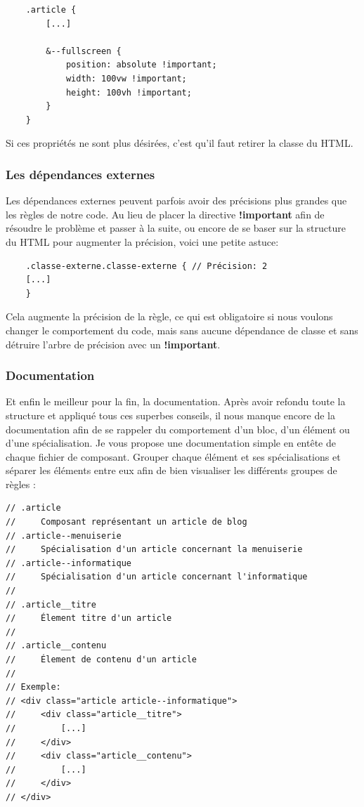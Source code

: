 \documentclass[12pt, a4paper]{report}
\begin{document}
\begin{appendix}
\begin{lstlisting}
    .article {
        [...]

        &--fullscreen {
            position: absolute !important;
            width: 100vw !important;
            height: 100vh !important;
        }
    }
\end{lstlisting}

Si ces propriétés ne sont plus désirées, c'est qu'il faut retirer la classe du HTML.

\subsubsection{Les dépendances externes}

Les dépendances externes peuvent parfois avoir des précisions plus grandes que les règles de notre code.
Au lieu de placer la directive \textbf{!important} afin de résoudre le problème et passer à la suite, ou encore de se baser sur la structure du HTML pour augmenter la précision, voici une petite astuce:

\begin{lstlisting}
    .classe-externe.classe-externe { // Précision: 2
    [...]
    }
\end{lstlisting}

Cela augmente la précision de la règle, ce qui est obligatoire si nous voulons changer le comportement du code, mais sans aucune dépendance de classe et sans détruire l'arbre de précision avec un \textbf{!important}.

\subsubsection{Documentation}

Et enfin le meilleur pour la fin, la documentation.
Après avoir refondu toute la structure et appliqué tous ces superbes conseils, il nous manque encore de la documentation afin de se rappeler du comportement d'un bloc, d'un élément ou d'une spécialisation.
Je vous propose une documentation simple en entête de chaque fichier de composant.
Grouper chaque élément et ses spécialisations et séparer les éléments entre eux afin de bien visualiser les différents groupes de règles :

\begin{lstlisting}
// .article
//     Composant représentant un article de blog
// .article--menuiserie
//     Spécialisation d'un article concernant la menuiserie
// .article--informatique
//     Spécialisation d'un article concernant l'informatique
//
// .article__titre
//     Élement titre d'un article
//
// .article__contenu
//     Élement de contenu d'un article
//
// Exemple:
// <div class="article article--informatique">
//     <div class="article__titre">
//         [...]
//     </div>
//     <div class="article__contenu">
//         [...]
//     </div>
// </div>


\end{lstlisting}
\end{appendix}
\end{document}
